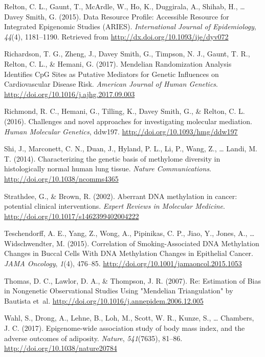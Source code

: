 \documentclass[11pt,twoside]{bristolthesis}
\newlength{\cslhangindent}
\newenvironment{cslreferences}%
  {\setlength{\parindent}{0pt}%
  \everypar{\setlength{\hangindent}{\cslhangindent}}\ignorespaces}%
  {\par}
\begin{document}
\begin{cslreferences}
\leavevmode\hypertarget{ref-Relton2015}{}%
Relton, C. L., Gaunt, T., McArdle, W., Ho, K., Duggirala, A., Shihab, H., \ldots{} Davey Smith, G. (2015). Data Resource Profile: Accessible Resource for Integrated Epigenomic Studies (ARIES). \emph{International Journal of Epidemiology}, \emph{44}(4), 1181--1190. Retrieved from \url{http://dx.doi.org/10.1093/ije/dyv072}

\leavevmode\hypertarget{ref-Richardson2017}{}%
Richardson, T. G., Zheng, J., Davey Smith, G., Timpson, N. J., Gaunt, T. R., Relton, C. L., \& Hemani, G. (2017). Mendelian Randomization Analysis Identifies CpG Sites as Putative Mediators for Genetic Influences on Cardiovascular Disease Risk. \emph{American Journal of Human Genetics}. \url{http://doi.org/10.1016/j.ajhg.2017.09.003}

\leavevmode\hypertarget{ref-Richmond2016}{}%
Richmond, R. C., Hemani, G., Tilling, K., Davey Smith, G., \& Relton, C. L. (2016). Challenges and novel approaches for investigating molecular mediation. \emph{Human Molecular Genetics}, ddw197. \url{http://doi.org/10.1093/hmg/ddw197}

\leavevmode\hypertarget{ref-Shi2014}{}%
Shi, J., Marconett, C. N., Duan, J., Hyland, P. L., Li, P., Wang, Z., \ldots{} Landi, M. T. (2014). Characterizing the genetic basis of methylome diversity in histologically normal human lung tissue. \emph{Nature Communications}. \url{http://doi.org/10.1038/ncomms4365}

\leavevmode\hypertarget{ref-Strathdee2002}{}%
Strathdee, G., \& Brown, R. (2002). Aberrant DNA methylation in cancer: potential clinical interventions. \emph{Expert Reviews in Molecular Medicine}. \url{http://doi.org/10.1017/s1462399402004222}

\leavevmode\hypertarget{ref-Teschendorff2015}{}%
Teschendorff, A. E., Yang, Z., Wong, A., Pipinikas, C. P., Jiao, Y., Jones, A., \ldots{} Widschwendter, M. (2015). Correlation of Smoking-Associated DNA Methylation Changes in Buccal Cells With DNA Methylation Changes in Epithelial Cancer. \emph{JAMA Oncology}, \emph{1}(4), 476--85. \url{http://doi.org/10.1001/jamaoncol.2015.1053}

\leavevmode\hypertarget{ref-Thomas2007}{}%
Thomas, D. C., Lawlor, D. A., \& Thompson, J. R. (2007). Re: Estimation of Bias in Nongenetic Observational Studies Using "Mendelian Triangulation" by Bautista et~al. \url{http://doi.org/10.1016/j.annepidem.2006.12.005}

\leavevmode\hypertarget{ref-Wahl2017}{}%
Wahl, S., Drong, A., Lehne, B., Loh, M., Scott, W. R., Kunze, S., \ldots{} Chambers, J. C. (2017). Epigenome-wide association study of body mass index, and the adverse outcomes of adiposity. \emph{Nature}, \emph{541}(7635), 81--86. \url{http://doi.org/10.1038/nature20784}


\end{cslreferences}
\end{document}
